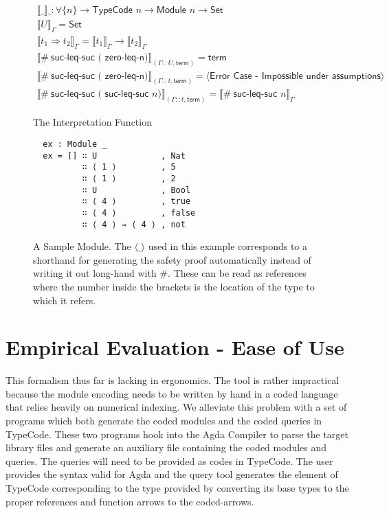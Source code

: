 \documentclass[acmsmall,review,authorversion]{acmart}
\newcommand{\type}[1]{\textsf{#1}}
\newcommand{\Set}{\type{Set}}
\newcommand{\Interp}[1]{\llbracket #1 \rrbracket}
\newcommand{\?}{\stackrel{?}{\approx}}
\begin{document}
  \begin{figure}
    \centering
  $$
  \begin{array}{l}
    \Interp{\_}\_ : \forall \{ n \} \rightarrow \textsf{TypeCode } n \rightarrow
    \textsf{Module } n \rightarrow \Set\\
    \Interp{ U }_\Gamma = \Set\\
    \Interp{ t_1 \Rightarrow t_2 }_\Gamma = \Interp{t_1}_\Gamma \rightarrow \Interp{t_2}_\Gamma\\
    \Interp{ \#\ \textsf{suc-leq-suc ( zero-leq-n)}}_{(\Gamma :: U ,
    \textsf{term})} = \textsf{term}\\
    \Interp{ \#\ \textsf{suc-leq-suc ( zero-leq-n)}}_{(\Gamma :: t ,
    \textsf{term})} = \langle\textsf{Error Case - Impossible under assumptions}\rangle\\
    \Interp{ \#\ \textsf{suc-leq-suc ( suc-leq-suc } n )}_{(\Gamma :: t ,
    \textsf{term})} = \Interp{ \#\ \textsf{suc-leq-suc } n }_\Gamma
  \end{array}
  $$
  \caption{The Interpretation Function}
  \label{fig:interp}
\end{figure}

\begin{figure}
  \centering
\begin{verbatim}
  ex : Module _
  ex = [] ∷ U             , Nat
          ∷ ⟨ 1 ⟩         , 5
          ∷ ⟨ 1 ⟩         , 2
          ∷ U             , Bool
          ∷ ⟨ 4 ⟩         , true
          ∷ ⟨ 4 ⟩         , false
          ∷ ⟨ 4 ⟩ ⇒ ⟨ 4 ⟩ , not
\end{verbatim}
  \caption{A Sample Module.
  The $\langle\_\rangle$ used in this example corresponds to a shorthand for
  generating the safety proof automatically instead of writing it out long-hand
  with $\#$. These can be read as references where the number inside the
  brackets is the location of the type to which it refers.}
  \label{fig:ex}
\end{figure}


\section{Empirical Evaluation - Ease of Use}

This formalism thus far is lacking in ergonomics. The tool is rather impractical
because the module encoding needs to be written by hand in a coded language that
relies heavily on numerical indexing. We alleviate this problem with a set of
programs which both generate the coded modules and the coded queries in
\textsf{TypeCode}. These two programs hook into the Agda Compiler to parse the
target library files and generate an auxiliary file containing the coded modules
and queries. The queries will need to be provided as codes in \textsf{TypeCode}.
The user provides the syntax valid for Agda and the query tool generates the
element of \textsf{TypeCode} corresponding to the type provided by converting
its base types to the proper references and function arrows to the coded-arrows.
\end{document}

